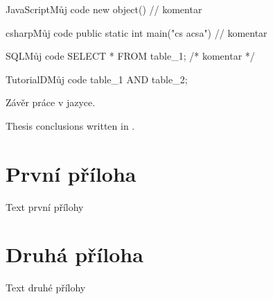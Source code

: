 \documentclass[12pt]{article}
\begin{document}
\begin{upcode}{JavaScript}{}{Můj code}
new object() // komentar
\end{upcode}

\begin{upcode}{csharp}{}{Můj code}
public static int main("cs acsa") // komentar
\end{upcode}

\begin{upcode}{SQL}{}{Můj code}
SELECT * FROM table_1; /* komentar */
\end{upcode}

\begin{upcode}{TutorialD}{}{Můj code}
table_1 AND table_2;
\end{upcode}

\upendofmainmatter

\begin{upconclusions}[czech]
Závěr práce v  jazyce.
\end{upconclusions}

\begin{upconclusions}[english]
Thesis conclusions written in .
\end{upconclusions}

\appendix
\section{První příloha}
Text první přílohy

\section{Druhá příloha}
Text druhé přílohy

\printglossary

\nocite{*}							%
\printbibliography

%

\printindex
\end{document}
